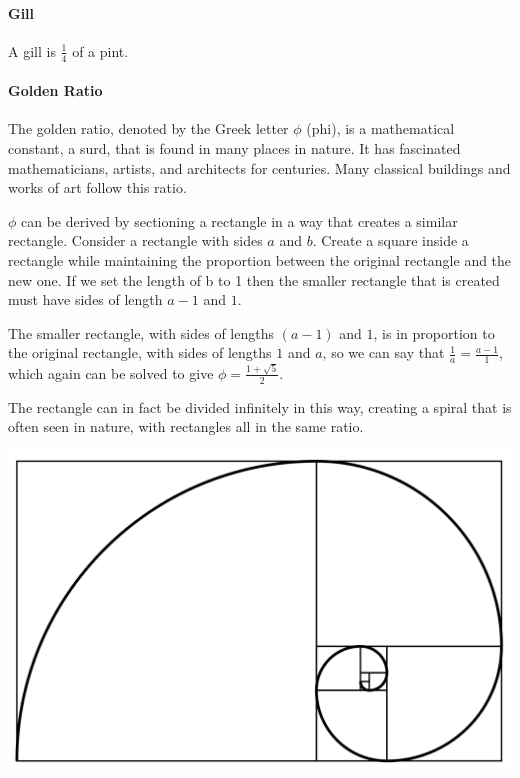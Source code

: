 \documentclass[12pt]{article}
\begin{document}
\paragraph{Gill}
A gill is $\frac{1}{4}$ of a pint.

\paragraph{Golden Ratio}
The golden ratio, denoted by the Greek letter $\phi$ (phi), is a mathematical constant, a surd, that is found in many places in nature. It has fascinated mathematicians, artists, and architects for centuries. Many classical buildings and works of art follow this ratio.

$\phi$ can be derived by sectioning a rectangle in a way that creates a similar rectangle. Consider a rectangle with sides $a$ and $b$. Create a square inside a rectangle while maintaining the proportion between the original rectangle and the new one. If we set the length of b to 1 then the smaller rectangle that is created must have sides of length $a-1$ and $1$.

\begin{center}
\end{center}

The smaller rectangle, with sides of lengths $(a-1)$ and $1$, is in proportion to the original rectangle, with sides of lengths $1$ and $a$, so we can say that $\frac{1}{a}=\frac{a-1}{1}$, which again can be solved to give $\phi=\frac{1+\sqrt{5}}{2}$.

The rectangle can in fact be divided infinitely in this way, creating a spiral that is often seen in nature, with rectangles all in the same ratio.

\includegraphics[width=\textwidth]{Ratio-1024x648.png}
\end{document}
